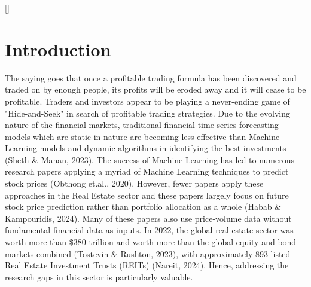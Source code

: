 \documentclass[a4paper,12pt]{report}
\renewcommand\thechapter{\Roman{chapter}}
\numberwithin{equation}{section}
\theoremstyle{definition}
\begin{document}
\titleformat{\chapter}[display]{\Large}{\centering
  \MakeUppercase{\chaptername}\quad{\Huge\thechapter}}{10pt}{\titlerule[.5pt]\vspace{10pt}\centering
  \MakeUppercase}[\vspace{10pt}{\titlerule[.5pt]}]%
\titlespacing{\chapter}{0pt}{-50pt}{1cm}%


\tableofcontents


\setcounter{chapter}{1}
\renewcommand{\thechapter}{\arabic{chapter}}
\setcounter{chapter}{0}
\setcounter{page}{0}
\chapter{Introduction}
The saying goes that once a profitable trading formula has been discovered and traded on by enough people, its profits will be eroded away and it will cease to be profitable. Traders and investors appear to be playing a never-ending game of "Hide-and-Seek" in search of profitable trading strategies. Due to the evolving nature of the financial markets, traditional financial time-series forecasting models which are static in nature are becoming less effective than Machine Learning models and dynamic algorithms in identifying the best investments (Sheth \& Manan, 2023). The success of Machine Learning has led to numerous research papers applying a myriad of Machine Learning techniques to predict stock prices (Obthong et.al., 2020). However, fewer papers apply these approaches in the Real Estate sector and these papers largely focus on future stock price prediction rather than portfolio allocation as a whole (Habab \& Kampouridis, 2024). Many of these papers also use price-volume data without fundamental financial data as inputs. In 2022, the global real estate sector was worth more than \$380 trillion and worth more than the global equity and bond markets combined (Tostevin \& Rushton, 2023), with approximately 893 listed Real Estate Investment Trusts (REITs) (Nareit, 2024). Hence, addressing the research gaps in this sector is particularly valuable.
\end{document}
